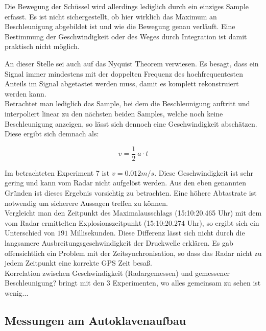 \documentclass[12pt,a4paper]{scrartcl}
\begin{document}
Die Bewegung der Schüssel wird allerdings lediglich durch ein einziges Sample erfasst. Es ist nicht sichergestellt, ob hier wirklich das Maximum an Beschleunigung abgebildet ist und wie die Bewegung genau verläuft. Eine Bestimmung der Geschwindigkeit oder des Weges durch Integration ist damit praktisch nicht möglich. 

An dieser Stelle sei auch auf das Nyquist Theorem verwiesen. Es besagt, dass ein Signal immer mindestens mit der doppelten Frequenz des hochfrequentesten Anteils im Signal abgetastet werden muss, damit es komplett rekonstruiert werden kann.  \citep[vgl.][]{Shannon:1949uq}\\

Betrachtet man lediglich das Sample, bei dem die Beschleunigung auftritt und interpoliert linear zu den nächsten beiden Samples, welche noch keine Beschleunigung anzeigen, so lässt sich dennoch eine Geschwindigkeit abschätzen. Diese ergibt sich demnach als:

\begin{equation}
v = \frac{1}{2} ~a \cdot t
\end{equation}

Im betrachteten Experiment 7 ist $v = 0.012 m/s$. Diese Geschwindigkeit ist sehr gering und kann vom Radar nicht aufgelöst werden. Aus den eben genannten Gründen ist dieses Ergebnis vorsichtig zu betrachten. Eine höhere Abtastrate ist notwendig um sicherere Aussagen treffen zu können.\\


Vergleicht man den Zeitpunkt des Maximalausschlags (15:10:20.465 Uhr) mit dem vom Radar ermittelten Explosionszeitpunkt (15:10:20.274 Uhr), so ergibt sich ein Unterschied von $191$ Millisekunden. Diese Differenz lässt sich nicht durch die langsamere Ausbreitungsgeschwindigkeit der Druckwelle erklären. Es gab offensichtlich ein Problem mit der Zeitsynchronisation, so dass das Radar nicht zu jedem Zeitpunkt eine korrekte GPS Zeit besaß. \\



{\color{red}Korrelation zwischen Geschwindigkeit (Radargemessen) und gemessener Beschleunigung? bringt mit den 3 Experimenten, wo alles gemeinsam zu sehen ist wenig... }




\subsection{Messungen am Autoklavenaufbau}
\end{document}

